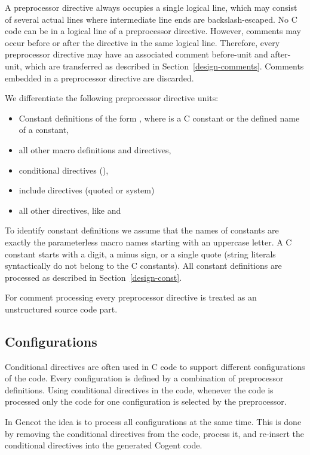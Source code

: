 
A preprocessor directive always occupies a single logical line, which may consist of several actual lines where 
intermediate line ends are backslash-escaped. No C code can be in a logical line of a preprocessor directive.
However, comments may occur before or after the directive in the same logical line. Therefore, every preprocessor 
directive may have an associated comment before-unit and after-unit, which are transferred as described in 
Section~\ref{design-comments}. Comments embedded in a preprocessor directive are discarded.

We differentiate the following preprocessor directive units:
\begin{itemize}
\item Constant definitions of the form , where  is a C constant or the defined 
name of a constant,
\item all other macro definitions and  directives,
\item conditional directives (),
\item include directives (quoted or system)
\item all other directives, like  and 
\end{itemize}

To identify constant definitions we assume that the names of constants are exactly the parameterless macro names 
starting with an uppercase letter. A C constant starts with a digit, a minus sign, or a single quote 
(string literals syntactically do not belong to the C constants). All constant definitions are processed
as described in Section~\ref{design-const}.

For comment processing every preprocessor directive is treated as an unstructured source code part.

\subsection{Configurations}

Conditional directives are often used in C code to support different configurations of the code. Every configuration
is defined by a combination of preprocessor definitions. Using conditional directives in the code, whenever the
code is processed only the code for one configuration is selected by the preprocessor.

In Gencot the idea is to process all configurations at the same time. This is done by removing the conditional 
directives from the code, process it, and re-insert the conditional directives into the generated Cogent code.

